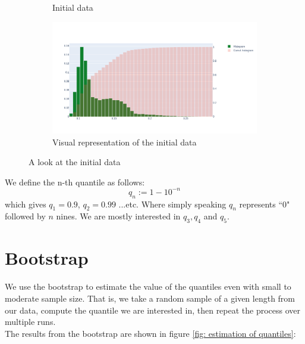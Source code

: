 \documentclass{article}
\begin{document}
\begin{figure}[H]
\begin{subfigure}{.25\textwidth}
        \caption{Initial data}
        \label{fig: initial data}
    \end{subfigure}
    \hfill
    \begin{subfigure}{.74\textwidth}
        \centering
        \includegraphics[width=\textwidth]{images/plot_excel_data.png}
        \caption{Visual representation of the initial data}
        \label{fig: visual representation of the initial data}
    \end{subfigure}
    \caption{A look at the initial data}
\end{figure}

We define the n-th quantile as follows:
\begin{equation}
    q_n := 1 - 10^{-n}
\end{equation}
which gives $q_1 = 0.9$, $q_2 = 0.99$ ...etc. Where simply speaking $q_n$ represents ``0" followed by $n$ nines. We are mostly interested in $q_3, q_4$ and $q_5$.

\section{Bootstrap}
\label{section: bootstrap}
We use the bootstrap to estimate the value of the quantiles even with small to moderate sample size. That is, we take a random sample of a given length from our data, compute the quantile we are interested in, then repeat the process over multiple runs. \\
The results from the bootstrap are shown in figure \ref{fig: estimation of quantiles}:
\end{document}
